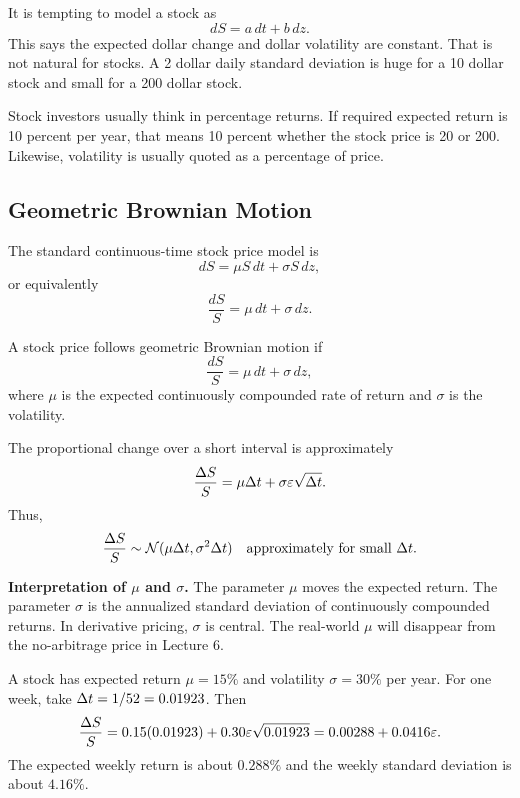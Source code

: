It is tempting to model a stock as
\[
    dS = a\,dt + b\,dz.
\]
This says the expected dollar change and dollar volatility are constant. That
is not natural for stocks. A 2 dollar daily standard deviation is huge for a
10 dollar stock and small for a 200 dollar stock.

Stock investors usually think in percentage returns. If required expected
return is 10 percent per year, that means 10 percent whether the stock price is
20 or 200. Likewise, volatility is usually quoted as a percentage of price.

\subsection{Geometric Brownian Motion}

The standard continuous-time stock price model is
\[
    dS = \mu S\,dt + \sigma S\,dz,
\]
or equivalently
\[
    \frac{dS}{S} = \mu\,dt + \sigma\,dz.
\]

\begin{defN}
A stock price follows geometric Brownian motion if
\[
    \frac{dS}{S} = \mu\,dt + \sigma\,dz,
\]
where $\mu$ is the expected continuously compounded rate of return and
$\sigma$ is the volatility.
\end{defN}

The proportional change over a short interval is approximately
\[
    \frac{\Delta S}{S}
    =
    \mu\Delta t+\sigma\varepsilon\sqrt{\Delta t}.
\]
Thus,
\[
    \frac{\Delta S}{S}
    \sim
    \mathcal{N}(\mu\Delta t,\sigma^2\Delta t)
    \quad
    \text{approximately for small } \Delta t.
\]

\begin{boxD}
\textbf{Interpretation of $\mu$ and $\sigma$.} The parameter $\mu$ moves the
expected return. The parameter $\sigma$ is the annualized standard deviation of
continuously compounded returns. In derivative pricing, $\sigma$ is central.
The real-world $\mu$ will disappear from the no-arbitrage price in Lecture 6.
\end{boxD}

\begin{exmp}
A stock has expected return $\mu=15\%$ and volatility $\sigma=30\%$ per year.
For one week, take $\Delta t=1/52=0.01923$. Then
\[
    \frac{\Delta S}{S}
    =
    0.15(0.01923)+0.30\varepsilon\sqrt{0.01923}
    =
    0.00288+0.0416\varepsilon.
\]
The expected weekly return is about $0.288\%$ and the weekly standard deviation
is about $4.16\%$.
\end{exmp}

